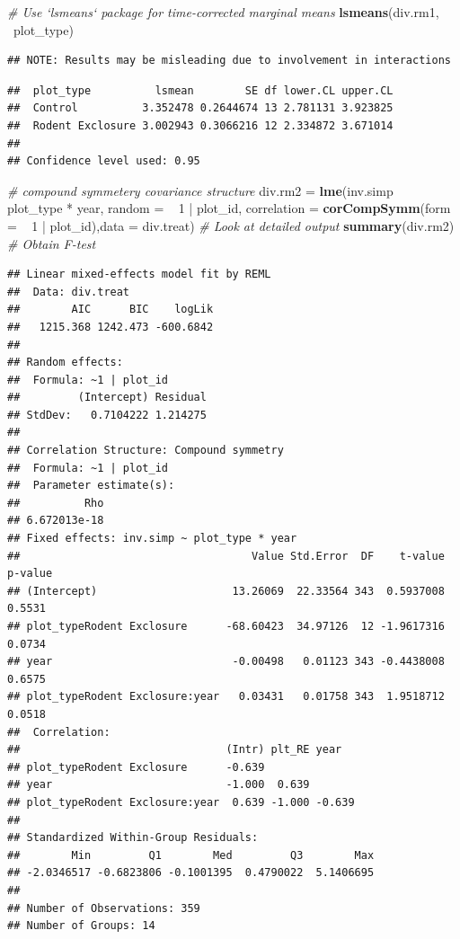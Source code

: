 \documentclass[]{article}
\newenvironment{Shaded}{\begin{snugshade}}{\end{snugshade}}
\newcommand{\KeywordTok}[1]{\textcolor[rgb]{0.13,0.29,0.53}{\textbf{{#1}}}}
\newcommand{\DataTypeTok}[1]{\textcolor[rgb]{0.13,0.29,0.53}{{#1}}}
\newcommand{\DecValTok}[1]{\textcolor[rgb]{0.00,0.00,0.81}{{#1}}}
\newcommand{\StringTok}[1]{\textcolor[rgb]{0.31,0.60,0.02}{{#1}}}
\newcommand{\CommentTok}[1]{\textcolor[rgb]{0.56,0.35,0.01}{\textit{{#1}}}}
\newcommand{\NormalTok}[1]{{#1}}
\begin{document}
\begin{Shaded}
\begin{Highlighting}[]
\CommentTok{# Use `lsmeans` package for time-corrected marginal means}
\KeywordTok{lsmeans}\NormalTok{(div.rm1, ~plot_type)}
\end{Highlighting}
\end{Shaded}

\begin{verbatim}
## NOTE: Results may be misleading due to involvement in interactions
\end{verbatim}

\begin{verbatim}
##  plot_type          lsmean        SE df lower.CL upper.CL
##  Control          3.352478 0.2644674 13 2.781131 3.923825
##  Rodent Exclosure 3.002943 0.3066216 12 2.334872 3.671014
## 
## Confidence level used: 0.95
\end{verbatim}

\begin{Shaded}
\begin{Highlighting}[]
\CommentTok{# compound symmetery covariance structure}
\NormalTok{div.rm2 =}\StringTok{ }\KeywordTok{lme}\NormalTok{(inv.simp ~}\StringTok{ }\NormalTok{plot_type *}\StringTok{ }\NormalTok{year, }\DataTypeTok{random =} \NormalTok{~}\StringTok{ }\DecValTok{1} \NormalTok{|}\StringTok{ }\NormalTok{plot_id, }\DataTypeTok{correlation =} \KeywordTok{corCompSymm}\NormalTok{(}\DataTypeTok{form =} \NormalTok{~}\StringTok{ }\DecValTok{1} \NormalTok{|}\StringTok{ }\NormalTok{plot_id),}\DataTypeTok{data =} \NormalTok{div.treat) }\CommentTok{# Look at detailed output}
\KeywordTok{summary}\NormalTok{(div.rm2) }\CommentTok{# Obtain F-test}
\end{Highlighting}
\end{Shaded}

\begin{verbatim}
## Linear mixed-effects model fit by REML
##  Data: div.treat 
##        AIC      BIC    logLik
##   1215.368 1242.473 -600.6842
## 
## Random effects:
##  Formula: ~1 | plot_id
##         (Intercept) Residual
## StdDev:   0.7104222 1.214275
## 
## Correlation Structure: Compound symmetry
##  Formula: ~1 | plot_id 
##  Parameter estimate(s):
##          Rho 
## 6.672013e-18 
## Fixed effects: inv.simp ~ plot_type * year 
##                                    Value Std.Error  DF    t-value p-value
## (Intercept)                     13.26069  22.33564 343  0.5937008  0.5531
## plot_typeRodent Exclosure      -68.60423  34.97126  12 -1.9617316  0.0734
## year                            -0.00498   0.01123 343 -0.4438008  0.6575
## plot_typeRodent Exclosure:year   0.03431   0.01758 343  1.9518712  0.0518
##  Correlation: 
##                                (Intr) plt_RE year  
## plot_typeRodent Exclosure      -0.639              
## year                           -1.000  0.639       
## plot_typeRodent Exclosure:year  0.639 -1.000 -0.639
## 
## Standardized Within-Group Residuals:
##        Min         Q1        Med         Q3        Max 
## -2.0346517 -0.6823806 -0.1001395  0.4790022  5.1406695 
## 
## Number of Observations: 359
## Number of Groups: 14
\end{verbatim}
\end{document}
